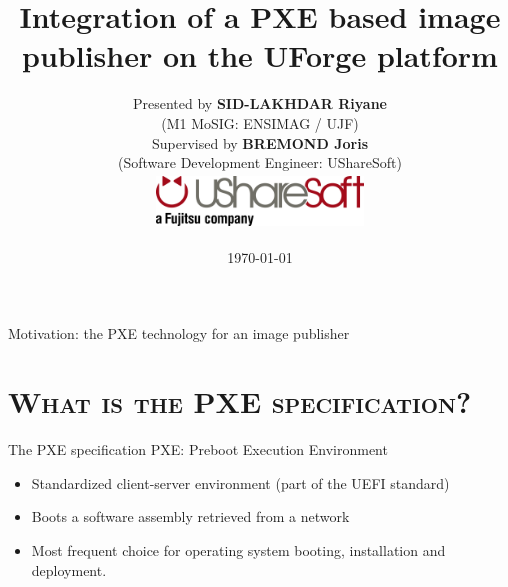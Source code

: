 \documentclass[xcolor=x11names,compress]{beamer}
\renewcommand{\(}{\begin{columns}}
\renewcommand{\)}{\end{columns}}
\newcommand{\<}[1]{\begin{column}{#1}}
\renewcommand{\>}{\end{column}}
\begin{document}

\begin{frame}
\title{Integration of a PXE based image publisher on the UForge platform}
\author
{
	Presented by \textbf{SID-LAKHDAR Riyane}\\
	(M1 MoSIG: ENSIMAG / UJF)\\
	Supervised by \textbf{BREMOND Joris}\\
	(Software Development Engineer: UShareSoft)\\
	\vspace{1cm}
	\includegraphics[height=1.5cm,width=5.5cm]{logo/logo_usharesoft.png}
}
\date
{
	\vspace{1cm}
	\today
}
\titlepage
\end{frame}


\begin{frame}{Motivation: the PXE technology for an image publisher}
\tableofcontents
\end{frame}



\section{\scshape What is the PXE specification?}
\begin{frame}{The PXE specification}
	PXE: Preboot Execution Environment
	\begin{itemize}[<+->]
		\item Standardized client-server environment (part of the UEFI standard)
		\item Boots a software assembly retrieved from a network
		\item Most frequent choice for operating system booting, installation and deployment.
	\end{itemize}
\end{frame}
\end{document}
